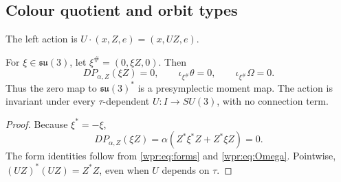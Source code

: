 \subsection{Colour quotient and orbit types}
The left action is \(U\cdot(x,Z,e)=(x,UZ,e)\).

\begin{lemma}
\label{wpr:lem:null}
For \(\xi\in\mathfrak{su}(3)\), let \(\xi^\#=(0,\xi Z,0)\).  Then
\[
 D P_{\alpha,Z}(\xi Z)=0,\qquad
 \iota_{\xi^\#}\theta=0,\qquad
 \iota_{\xi^\#}\Omega=0.
\]
Thus the zero map to \(\mathfrak{su}(3)^*\) is a presymplectic moment
map.  The action is invariant under every \(\tau\)-dependent
\(U:I\to SU(3)\), with no connection term.
\end{lemma}
\begin{proof}
Because \(\xi^*=-\xi\),
\[
 D P_{\alpha,Z}(\xi Z)=
 \alpha(Z^*\xi^*Z+Z^*\xi Z)=0.
\]
The form identities follow from \eqref{wpr:eq:forms} and
\eqref{wpr:eq:Omega}.  Pointwise,
\((UZ)^*(UZ)=Z^*Z\), even when \(U\) depends on \(\tau\).
\end{proof}

